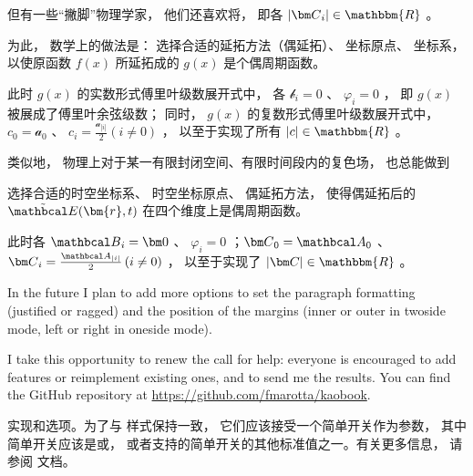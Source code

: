 但有一些“撇脚”物理学家， 他们还喜欢将， 即各
$ \left| {\bm C}_i \right| \in \mathbbm{R} $ 。 

为此， 数学上的做法是： 选择合适的延拓方法（偶延拓）、 坐标原点、 坐标系， 以使原函数 $ f(x) $ 所延拓成的
 $ g(x) $ 是个偶周期函数。 

此时 $ g(x) $ 的实数形式傅里叶级数展开式中， 各 $ {\mathcal b}_i = 0 $ 、 $ \varphi_i = 0 $ ， 
即 $ g(x) $ 被展成了傅里叶余弦级数； 同时， $ g(x) $ 的复数形式傅里叶级数展开式中， 
$ c_0 = {\mathcal a}_0 $ 、 $ c_i = \frac{{\mathcal a}_{\left| i \right|}}{2} \left( {i \ne 0} \right) $ 
， 以至于实现了所有 $ \left| c \right| \in \mathbbm{R} $ 。

类似地， 物理上对于某一有限封闭空间、有限时间段内的复色场， 也总能做到

选择合适的时空坐标系、 时空坐标原点、 偶延拓方法， 
使得偶延拓后的 $ \tilde {{\mathbcal E}}(\bm{r},t) $ 在四个维度上是偶周期函数。 

此时各 $ {\mathbcal B}_i = {\bm 0} $ 、 $ \varphi_i = 0 $ ；$ {\bm C}_0 = {\mathbcal A}_0 $ 、 
$ {\bm C}_i = \frac{{\mathbcal A}_{\left| i \right|}}{2} \left( {i \ne 0} \right) $ ， 以至于实现了 
$ \left| {\bm C} \right| \in \mathbbm{R} $ 。

In the future I plan to add more options to set the paragraph formatting
(justified or ragged) and the position of the margins (inner or outer in
twoside mode, left or right in oneside mode).

I take this opportunity to renew the call for help: everyone is
encouraged to add features or reimplement existing ones, and to send me
the results. You can find the GitHub repository at
\url{https://github.com/fmarotta/kaobook}.

\begin{kaobox}[frametitle=To Do]
实现和选项。为了与\KOMAScript\xspace 样式保持一致， 它们应该接受一个简单开关作为参数， 其中简单开关应该是或， 或者\KOMAScript 支持的简单开关的其他标准值之一。有关更多信息， 请参阅\KOMAScript\xspace 文档。
\end{kaobox}

